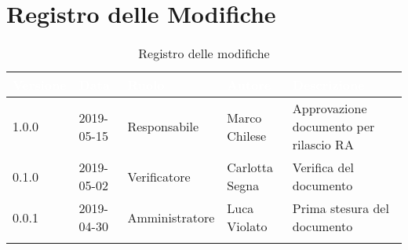 \newpage

\section*{Registro delle Modifiche}

\begin{center}
\begin{longtable}[c]{|m{}|m{}|m{}|m{}|p{}|}
\hline
\rowcolor{bluelogo}\textbf{\textcolor{white}{Versione}} & \textbf{\textcolor{white}{Data}} & \textbf{\textcolor{white}{Ruolo}} & \textbf{\textcolor{white}{Autore}} & \textbf{\textcolor{white}{Descrizione}}\\
\endfirsthead
\hline \hline
1.0.0 & 2019-05-15 & Responsabile & Marco Chilese & Approvazione documento per rilascio RA  \\
\hline
\rowcolor{grigio} 0.1.0 & 2019-05-02 & Verificatore & Carlotta Segna & Verifica del documento \\
\hline
0.0.1 & 2019-04-30 & Amministratore & Luca Violato & Prima stesura del documento\\
\hline
\caption{Registro delle modifiche}
\end{longtable}
\end{center}
